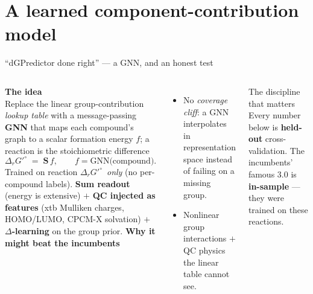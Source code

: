 \documentclass[aspectratio=169,11pt]{beamer}
\newcommand{\dg}{\ensuremath{\Delta_r G'^{\circ}}}
\begin{document}
\section{A learned component-contribution model}

\begin{frame}{``dGPredictor done right'' — a GNN, and an honest test}
  \begin{columns}[T]
      \textbf{The idea}\\[0.2em]
      Replace the linear group-contribution \emph{lookup table} with a
      message-passing \textbf{GNN} that maps each compound's graph to a scalar
      formation energy $f$; a reaction is the stoichiometric difference
      \[
        \Delta_r G'^{\circ} \;=\; \mathbf{S}\,f ,\qquad f=\text{GNN(compound)} .
      \]
      Trained on reaction \dg\ \emph{only} (no per-compound labels).
      \textbf{Sum readout} (energy is extensive) $+$ \textbf{QC injected as
      features} (xtb Mulliken charges, HOMO/LUMO, CPCM-X solvation) $+$
      \textbf{$\Delta$-learning} on the group prior.
      \textbf{Why it might beat the incumbents}
      \begin{itemize}
        \item No \emph{coverage cliff}: a GNN interpolates in representation
              space instead of failing on a missing group.
        \item Nonlinear group interactions $+$ QC physics the linear table
              cannot see.
      \end{itemize}
      \vspace{0.3em}
      \begin{alertblock}{The discipline that matters}
        Every number below is \textbf{held-out} cross-validation. The
        incumbents' famous 3.0 is \textbf{in-sample} — they were trained on
        these reactions.
      \end{alertblock}
  \end{columns}
\end{frame}
\end{document}
